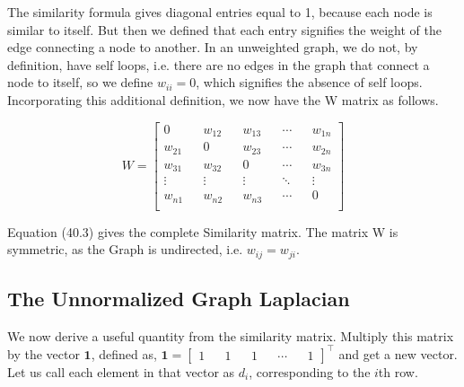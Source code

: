 \documentclass[english]{article}
\theoremstyle{plain}
\begin{document}
The similarity formula gives diagonal entries equal to 1, because each node is similar to itself. But then we defined that each entry signifies the weight of the edge connecting a node to another. In an unweighted graph, we do not, by definition, have self loops, i.e. there are no edges in the graph that connect a node to itself, so we define $w_{ii}=0$, which signifies the absence of self loops. Incorporating this additional definition, we now have the W matrix as follows.

\begin{equation}
W = 
\begin{bmatrix}
0 && w_{12} && w_{13} && \cdots && w_{1n} \\
w_{21} && 0 && w_{23} && \cdots && w_{2n} \\
w_{31} && w_{32} && 0 && \cdots && w_{3n} \\
\vdots && \vdots && \vdots && \ddots && \vdots \\
w_{n1} && w_{n2} && w_{n3} && \cdots && 0 \\
\end{bmatrix}
\end{equation}

Equation (40.3) gives the complete Similarity matrix. The matrix W is symmetric, as the Graph is undirected, i.e. $w_{ij} = w_{ji}$.

\subsection{The Unnormalized Graph Laplacian}
We now derive a useful quantity from the similarity matrix. Multiply this matrix by the vector $\boldsymbol{1}$, defined as,
$\boldsymbol{1} =
\begin{bmatrix}
1 && 1 && 1 && \cdots && 1
\end{bmatrix}^{\top}$ and get a new vector. Let us call each element in that vector as $d_{i}$, corresponding to the $i$th row.  
\end{document}
